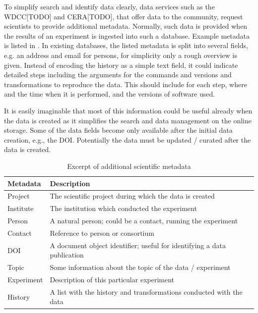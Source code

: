 \documentclass{../../template/esiwace-report}
\begin{document}

To simplify search and identify data clearly, data services such as the WDCC[TODO] and CERA[TODO], that offer data to the community, request scientists to provide additional metadata.
Normally, such data is provided when the results of an experiment is ingested into such a database.
Example metadata is listed in .
In existing databases, the listed metadata is split into several fields, e.g. an address and email for persons, for simplicity only a rough overview is given.
Instead of encoding the history as a simple text field, it could 
indicate detailed steps including the arguments for the commands and versions and transformations to reproduce the data.
This should include for each step, where and the time when it is performed, and the versions of software used.

It is easily imaginable that most of this information could be useful already when the data is created as it simplifies the search and data management on the online storage.
Some of the data fields become only available after the initial data creation, e.g., the DOI.
Potentially the data must be updated / curated after the data is created.

\begin{table}
\begin{tabular}{ll}
Metadata & Description\\
\hline
Project & The scientific project during which the data is created \\
Institute & The institution which conducted the experiment\\
Person &  A natural person; could be a contact, running the experiment \\
Contact & Reference to person or consortium \\
DOI      & A document object identifier; useful for identifying a data publication\\
Topic     & Some information about the topic of the data / experiment \\
Experiment & Description of this particular experiment \\
History & A list with the history and transformations conducted with the data \\
\end{tabular}
\caption{Excerpt of additional scientific metadata}
\label{tbl:additionalMetadata}
\end{table}

\end{document}
